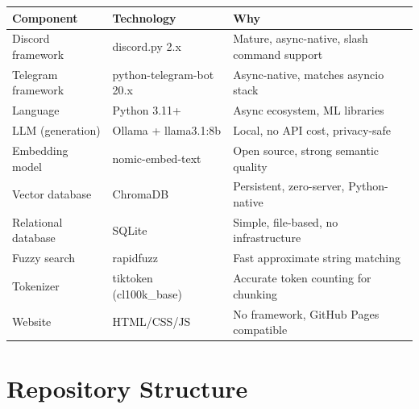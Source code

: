 \documentclass[12pt,letterpaper]{article}
\begin{document}
\begin{center}
\begin{tabular}{lll}
\toprule
\textbf{Component} & \textbf{Technology} & \textbf{Why} \\
\midrule
Discord framework & discord.py 2.x & Mature, async-native, slash command support \\
Telegram framework & python-telegram-bot 20.x & Async-native, matches asyncio stack \\
Language & Python 3.11+ & Async ecosystem, ML libraries \\
LLM (generation) & Ollama + llama3.1:8b & Local, no API cost, privacy-safe \\
Embedding model & nomic-embed-text & Open source, strong semantic quality \\
Vector database & ChromaDB & Persistent, zero-server, Python-native \\
Relational database & SQLite & Simple, file-based, no infrastructure \\
Fuzzy search & rapidfuzz & Fast approximate string matching \\
Tokenizer & tiktoken (cl100k\_base) & Accurate token counting for chunking \\
Website & HTML/CSS/JS & No framework, GitHub Pages compatible \\
\bottomrule
\end{tabular}
\end{center}

\section{Repository Structure}
\end{document}

